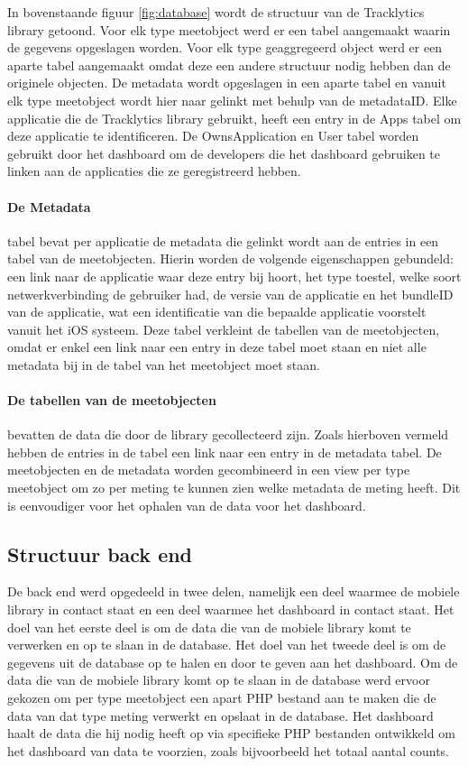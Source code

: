 In bovenstaande figuur \ref{fig:database} wordt de structuur van de Tracklytics library getoond. Voor elk type meetobject werd er een tabel aangemaakt waarin de gegevens opgeslagen worden. Voor elk type geaggregeerd object werd er een aparte tabel aangemaakt omdat deze een andere structuur nodig hebben dan de originele objecten. De metadata wordt opgeslagen in een aparte tabel en vanuit elk type meetobject wordt hier naar gelinkt met behulp van de metadataID. Elke applicatie die de Tracklytics library gebruikt, heeft een entry in de Apps tabel om deze applicatie te identificeren. De OwnsApplication en User tabel worden gebruikt door het dashboard om de developers die het dashboard gebruiken te linken aan de applicaties die ze geregistreerd hebben. \\

\paragraph{De Metadata} tabel bevat per applicatie de metadata die gelinkt wordt aan de entries in een tabel van de meetobjecten. Hierin worden de volgende eigenschappen gebundeld: een link naar de applicatie waar deze entry bij hoort, het type toestel, welke soort netwerkverbinding de gebruiker had, de versie van de applicatie en het bundleID van de applicatie, wat een identificatie van die bepaalde applicatie voorstelt vanuit het iOS systeem. Deze tabel verkleint de tabellen van de meetobjecten, omdat er enkel een link naar een entry in deze tabel moet staan en niet alle metadata bij in de tabel van het meetobject moet staan. 

\paragraph{De tabellen van de meetobjecten} bevatten de data die door de library gecollecteerd zijn. Zoals hierboven vermeld hebben de entries in de tabel een link naar een entry in de metadata tabel. De meetobjecten en de metadata worden gecombineerd in een view per type meetobject om zo per meting te kunnen zien welke metadata de meting heeft. Dit is eenvoudiger voor het ophalen van de data voor het dashboard.

\subsection{Structuur back end}
De back end werd opgedeeld in twee delen, namelijk een deel waarmee de mobiele library in contact staat en een deel waarmee het dashboard in contact staat. Het doel van het eerste deel is om de data die van de mobiele library komt te verwerken en op te slaan in de database. Het doel van het tweede deel is om de gegevens uit de database op te halen en door te geven aan het dashboard. Om de data die van de mobiele library komt op te slaan in de database werd ervoor gekozen om per type meetobject een apart PHP bestand aan te maken die de data van dat type meting verwerkt en opslaat in de database. Het dashboard haalt de data die hij nodig heeft op via specifieke PHP bestanden ontwikkeld om het dashboard van data te voorzien, zoals bijvoorbeeld het totaal aantal counts. 




